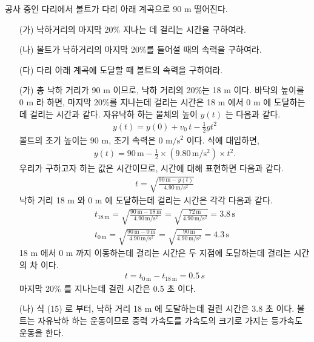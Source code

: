 \documentclass[APS,floatfix,nofootinbib,superscriptaddress,fleqn,preprint]{revtex4}
\begin{document}
공사 중인 다리에서 볼트가 다리 아래 계곡으로 90 m 떨어진다.
\begin{itemize}
\item[(가)] 낙하거리의 마지막 20\% 지나는 데 걸리는 시간을 구하여라.
\item[(나)] 볼트가 낙하거리의 마지막 20\%를 들어설 때의 속력을
  구하여라.
\item[(다)] 다리 아래 계곡에 도달할 때 볼트의 속력을 구하여라.   
\end{itemize} 
\begin{itemize}
  \item[(가)] 총 낙하 거리가 90 m 이므로, 낙하 거리의 20\%는 18 m 이다. 
  바닥의 높이를 0 m 라 하면, 마지막 20\%를 지나는데 걸리는 시간은 18 m 에서 0 m 에 도달하는데 걸리는 시간과 같다.
  자유낙하 하는 물체의 높이 $y(t)$ 는 다음과 같다.
  \begin{align}
    y(t) = y(0) +v_0\,t-\frac{1}{2}gt^2
  \end{align}
  볼트의 초기 높이는 90 m, 초기 속력은 0 $\mathrm{m/s^2}$ 이다. 식에 대입하면,
  \begin{align}
    y(t) = 90\,\mathrm{m}-\frac{1}{2}\times (9.80\,\mathrm{m/s^2}) \times t^2.    
  \end{align}
  우리가 구하고자 하는 값은 시간이므로, 시간에 대해 표현하면 다음과 같다.
  \begin{align}
    t=\sqrt{\frac{90\,\mathrm{m}-y(t)}{4.90\,\mathrm{m/s^2}}}
  \end{align}
  낙하 거리 18 m 와 0 m 에 도달하는데 걸리는 시간은 각각 다음과 같다.
  \begin{align}
    t_{18\,\mathrm{m}}=\sqrt{\frac{90\,\mathrm{m}-18\,\mathrm{m}}{4.90\,\mathrm{m/s^2}}} = \sqrt{\frac{72\,\mathrm{m}}{4.90\,\mathrm{m/s^2}}}=3.8\,\mathrm{s} \\
    t_{0\,\mathrm{m}}=\sqrt{\frac{90\,\mathrm{m}-0\,\mathrm{m}}{4.90\,\mathrm{m/s^2}}} = \sqrt{\frac{90\,\mathrm{m}}{4.90\,\mathrm{m/s^2}}}=4.3\,\mathrm{s}
  \end{align}
  18 m 에서 0 m 까지 이동하는데 걸리는 시간은 두 지점에 도달하는데 걸리는 시간의 차 이다.
  \begin{align}
    t = t_{0\,\mathrm{m}}-t_{18\,\mathrm{m}}= 0.5\mathrm\,{s}
  \end{align}
  마지막 20\% 를 지나는데 걸린 시간은 0.5 초 이다.
  \item[(나)] 식 (15) 로 부터, 낙하 거리 18 m 에 도달하는데 걸린 시간은 3.8 초 이다. 
  볼트는 자유낙하 하는 운동이므로 중력 가속도를 가속도의 크기로 가지는 등가속도 운동을 한다.

\end{itemize}
\end{document}
